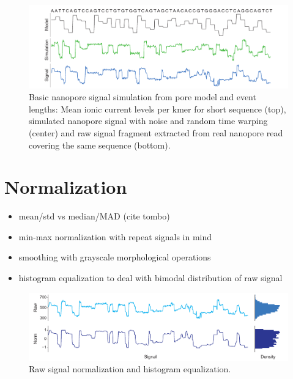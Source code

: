 \begin{figure}[h]
	\centering
	\includegraphics[width=1.0\textwidth]{figures/signal/simulation.pdf}
	\captionsetup{format=plain}
	\caption[Basic signal simulation]{Basic nanopore signal simulation from pore model and event lengths: Mean ionic current levels per kmer for short sequence (top), simulated nanopore signal with noise and random time warping (center) and raw signal fragment extracted from real nanopore read covering the same sequence (bottom).}
	\label{fig:signal:simulation}
\end{figure}




\section{Normalization}
\label{sec:signal:normalization}

\begin{itemize}
	\item mean/std vs median/MAD (cite tombo)
	\item min-max normalization with repeat signals in mind
	\item smoothing with grayscale morphological operations
	\item histogram equalization to deal with bimodal distribution of raw signal
\end{itemize}


\begin{figure}[h]
	\centering
	\includegraphics[width=1.0\textwidth]{figures/signal/normalization.pdf}
	\captionsetup{format=plain}
	\caption[Signal normalization and histogram equalization]{Raw signal normalization and histogram equalization.}
	\label{fig:signal:normalization}
\end{figure}




